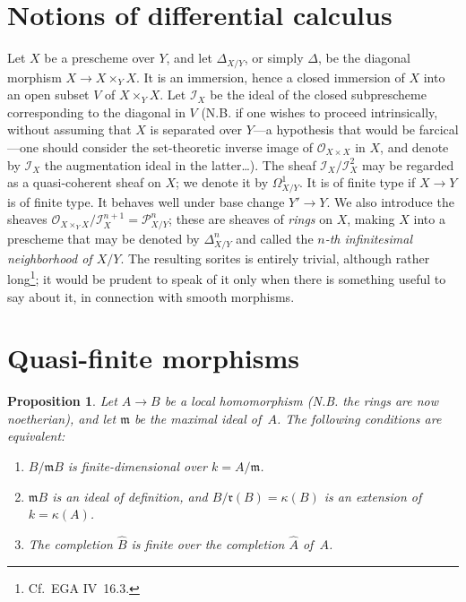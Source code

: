 \documentclass[11pt,oneside]{amsbook}
\newtheorem{proposition}{Proposition}[section]
\theoremstyle{remark}
\theoremstyle{plain}
\numberwithin{equation}{section}
\begin{document}
\section{Notions of differential calculus}
\label{I.1}

Let \(X\) be a prescheme over \(Y\), and let \(\Delta_{X/Y}\), or simply
\(\Delta\),\label{indnot:ab} be the diagonal morphism
\(X\to X\times_Y X\).  It is an
immersion, hence a closed immersion of \(X\) into an open subset \(V\) of
\(X\times_Y X\).  Let \(\mathcal I_X\) be the ideal of the closed
subprescheme corresponding to the diagonal in \(V\) (N.B. if one wishes to
proceed intrinsically, without assuming that \(X\) is separated over
\(Y\)---a hypothesis that would be farcical---one should consider the
set-theoretic inverse image of \(\mathcal O_{X\times X}\) in \(X\), and
denote by \(\mathcal I_X\) the augmentation ideal in the latter\ldots).
The sheaf \(\mathcal I_X/\mathcal I_X^2\) may be regarded as a
quasi-coherent sheaf on \(X\); we denote it by \(\Omega^1_{X/Y}\).  It is
\label{indnot:ac}
of finite type if \(X\to Y\) is of finite type.  It behaves well under base
change \(Y'\to Y\).  We also introduce the sheaves
\(\mathcal O_{X\times_Y X}/\mathcal I_X^{n+1}=\mathcal P^n_{X/Y}\);\label{indnot:ad} these
are sheaves of \emph{rings} on \(X\), making \(X\) into a prescheme that
may be denoted by \(\Delta^n_{X/Y}\)\label{indnot:ae} and called the \emph{\(n\)-th
infinitesimal neighborhood of \(X/Y\)}.  The resulting sorites is entirely
trivial, although rather long\footnote{Cf.\ EGA IV~16.3.}; it would be
prudent to speak of it only when there is something useful to say about it,
in connection with smooth morphisms.

\section{Quasi-finite morphisms}
\label{I.2}

\begin{proposition}
\label{I.2.1}
Let \(A\to B\) be a local homomorphism (N.B. the rings are now
noetherian), and let \(\mathfrak m\) be the maximal ideal of~\(A\).  The
following conditions are equivalent:
\begin{enumerate}
\item[(i)] \(B/\mathfrak mB\) is finite-dimensional over
  \(k=A/\mathfrak m\).
\item[(ii)] \(\mathfrak mB\) is an ideal of definition, and
  \(B/\mathfrak r(B)=\kappa(B)\) is an extension of
  \(k=\kappa(A)\).
\item[(iii)] The completion \(\widehat B\) is finite over the completion
  \(\widehat A\) of~\(A\).
\end{enumerate}
\end{proposition}
\end{document}
